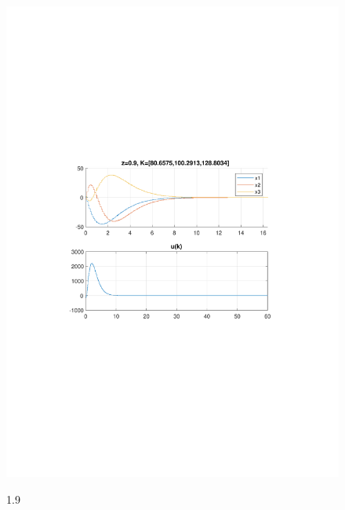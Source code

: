 \documentclass{article}
\begin{document}
{\begin{figure}[H]
\includegraphics[clip, trim=0.5cm 9.5cm 0.5cm 9.5cm, width=1.00\textwidth]{../rys/zad3_rys9.pdf}
\label{fig:rys3.1.9}
\caption{1.9}
\end{figure}
}
\newpage
\end{document}
